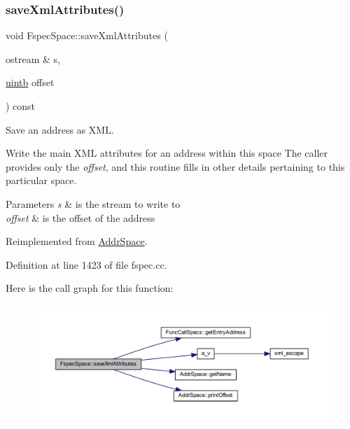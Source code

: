 \subsubsection{\texorpdfstring{saveXmlAttributes()}{saveXmlAttributes()}\hspace{0.1cm}{\footnotesize\ttfamily [1/2]}}
{\footnotesize\ttfamily void Fspec\+Space\+::save\+Xml\+Attributes (\begin{DoxyParamCaption}\item[{ostream \&}]{s,  }\item[{\mbox{\hyperlink{types_8h_a2db313c5d32a12b01d26ac9b3bca178f}{uintb}}}]{offset }\end{DoxyParamCaption}) const\hspace{0.3cm}{\ttfamily [virtual]}}



Save an address as X\+ML. 

Write the main X\+ML attributes for an address within this space The caller provides only the {\itshape offset}, and this routine fills in other details pertaining to this particular space. 
\begin{DoxyParams}{Parameters}
{\em s} & is the stream to write to \\
\hline
{\em offset} & is the offset of the address \\
\hline
\end{DoxyParams}


Reimplemented from \mbox{\hyperlink{class_addr_space_a4475d64c56141adf80cb0aca5b23e3c6}{Addr\+Space}}.



Definition at line 1423 of file fspec.\+cc.

Here is the call graph for this function\+:
\nopagebreak
\begin{figure}[H]
\begin{center}
\leavevmode
\includegraphics[width=350pt]{class_fspec_space_ad68a1bf048371fd9e5b4acb2b4bbf36c_cgraph}
\end{center}
\end{figure}
\mbox{\label{class_fspec_space_a668ef71841767a6d0b935831c14358fe}} 
